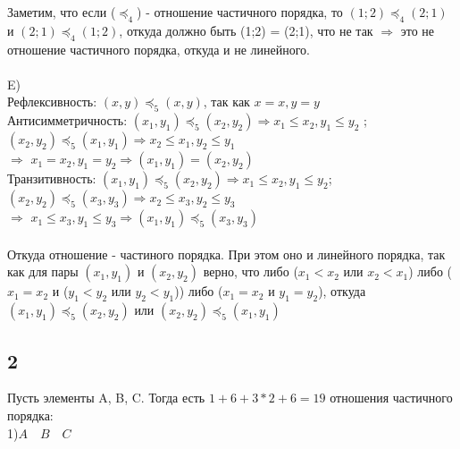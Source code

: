 		Заметим, что если ($\preccurlyeq_4$) - отношение частичного порядка, то
		$(1;2) \preccurlyeq_4 (2;1)$ и $(2;1) \preccurlyeq_4 (1;2)$, откуда должно быть (1;2) = (2;1), что не так $\Longrightarrow$ это не отношение частичного порядка, откуда и не линейного.
		\\ \\
		E)\\
		Рефлексивность: $(x, y) \preccurlyeq_5 (x, y)$, так как $x = x, y = y$\\
		Антисимметричность: $(x_1, y_1) \preccurlyeq_5 (x_2, y_2)  \Longrightarrow  x_1 \leqslant x_2, y_1 \leqslant y_2$ ;\\ 
		$(x_2, y_2) \preccurlyeq_5 (x_1, y_1)  \Longrightarrow  x_2 \leqslant x_1, y_2 \leqslant y_1$ \\
		$\Longrightarrow$ $x_1 = x_2, y_1 = y_2 \Longrightarrow (x_1, y_1) = (x_2, y_2)$\\
		Транзитивность: $(x_1, y_1) \preccurlyeq_5 (x_2, y_2)  \Longrightarrow  x_1 \leqslant x_2, y_1 \leqslant y_2$; \\
		$(x_2, y_2) \preccurlyeq_5 (x_3, y_3)  \Longrightarrow  x_2 \leqslant x_3, y_2 \leqslant y_3$ \\
		$\Longrightarrow$ $x_1 \leqslant x_3, y_1 \leqslant y_3 \Longrightarrow (x_1, y_1) \preccurlyeq_5 (x_3, y_3)$
		\\ \\
		Откуда отношение - частиного порядка. При этом оно и линейного порядка, так как для пары $(x_1, y_1)$ и $(x_2, y_2)$ верно, что либо ($x_1 < x_2$ или $x_2 < x_1$) либо ($x_1 = x_2$ и ($y_1 < y_2$ или $y_2 < y_1$)) либо ($x_1 = x_2$ и $y_1 = y_2$), откуда $(x_1, y_1) \preccurlyeq_5 (x_2, y_2)$ или $(x_2, y_2) \preccurlyeq_5 (x_1, y_1)$\\
		
		\newpage
		\subsection{2}
		Пусть элементы A, B, C. Тогда есть $1 + 6 + 3*2 + 6 = 19$ отношения частичного порядка:\\
		1)$A \quad B \quad C$\\
		\begin{center}
		\end{center}
		
